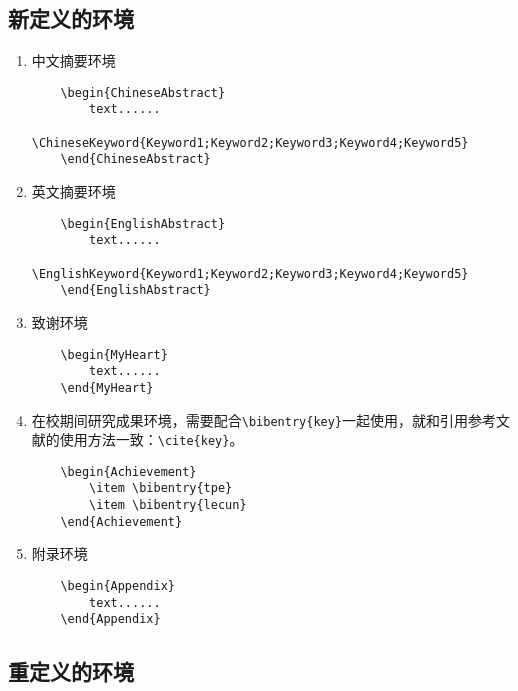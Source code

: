 \subsection{新定义的环境}
\begin{tcolorbox}[colback=gray!10,
    colframe=black,
    width=16cm,
    arc=1mm, auto outer arc,
    boxrule=0.5pt,]

    \begin{enumerate}
        \item 中文摘要环境
\begin{verbatim}
    \begin{ChineseAbstract}
        text......
        \ChineseKeyword{Keyword1;Keyword2;Keyword3;Keyword4;Keyword5}
    \end{ChineseAbstract}
\end{verbatim}
        \item 英文摘要环境
\begin{verbatim}
    \begin{EnglishAbstract}
        text......
        \EnglishKeyword{Keyword1;Keyword2;Keyword3;Keyword4;Keyword5}
    \end{EnglishAbstract}
\end{verbatim}
        \item 致谢环境
\begin{verbatim}
    \begin{MyHeart}
        text......
    \end{MyHeart}
\end{verbatim}
        \item 在校期间研究成果环境，需要配合\verb|\bibentry{key}|一起使用，就和引用参考文献的使用方法一致：\verb|\cite{key}|。
\begin{verbatim}
    \begin{Achievement}
        \item \bibentry{tpe}
        \item \bibentry{lecun}
    \end{Achievement}
\end{verbatim}
        \item 附录环境
\begin{verbatim}
    \begin{Appendix}
        text......
    \end{Appendix}
\end{verbatim}
    \end{enumerate}
\end{tcolorbox}

\subsection{重定义的环境}

